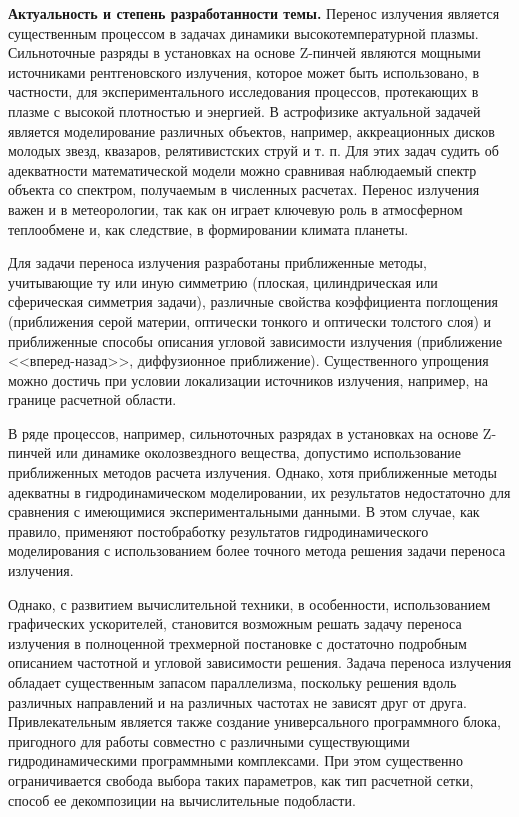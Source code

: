 \newcommand{\actuality}{{\textbf{Актуальность и степень разработанности темы.}}}
\newcommand{\aim}{{\textbf{Целью}}}
\newcommand{\tasks}{{\textbf{задачи}}}
\newcommand{\novelty}{{\textbf{Научная новизна:}}}
\newcommand{\influence}{{\textbf{Теоретическая и практическая значимость}}}
\newcommand{\defpositions}{{\textbf{Основные положения, выносимые на~защиту}}}
\newcommand{\probation}{{\textbf{Степень достоверности и апробация работы.}}}
\newcommand{\methodology}{{\textbf{Методология и методы исследования.}}}

{\actuality} Перенос излучения является существенным процессом в задачах динамики высокотемпературной плазмы. Сильноточные разряды в установках на основе Z-пинчей являются мощными источниками рентгеновского излучения, которое может быть использовано, в частности, для экспериментального исследования процессов, протекающих в плазме с высокой плотностью и энергией. 
В астрофизике актуальной задачей является моделирование различных объектов, например, аккреационных дисков молодых звезд, квазаров, релятивистских струй и т. п.
Для этих задач судить об адекватности математической модели можно сравнивая наблюдаемый спектр объекта со спектром, получаемым в численных расчетах.
Перенос излучения важен и в метеорологии, так как он играет ключевую роль в атмосферном теплообмене и, как следствие, в формировании климата планеты.

Для задачи переноса излучения разработаны приближенные методы, учитывающие ту или иную симметрию (плоская, цилиндрическая или сферическая симметрия задачи), различные свойства коэффициента поглощения (приближения серой материи, оптически тонкого и оптически толстого слоя) и приближенные способы описания угловой зависимости излучения (приближение <<вперед-назад>>, диффузионное приближение). Существенного упрощения можно достичь при условии локализации источников излучения, например, на границе расчетной области.

В ряде процессов, например, сильноточных разрядах в установках на основе Z-пинчей или динамике околозвездного вещества, допустимо использование приближенных методов расчета излучения. Однако, хотя приближенные методы адекватны в гидродинамическом моделировании, их результатов недостаточно для сравнения с имеющимися экспериментальными данными. В этом случае, как правило, применяют постобработку результатов гидродинамического моделирования с использованием более точного метода решения задачи переноса излучения.

Однако, с развитием вычислительной техники, в особенности, использованием графических ускорителей, становится возможным решать задачу переноса излучения в полноценной трехмерной постановке с достаточно подробным описанием частотной и угловой зависимости решения. Задача переноса излучения обладает существенным запасом параллелизма, поскольку решения вдоль различных направлений и на различных частотах не зависят друг от друга. Привлекательным является также создание универсального программного блока, пригодного для работы совместно с различными существующими гидродинамическими программными комплексами. При этом существенно ограничивается свобода выбора таких параметров, как тип расчетной сетки, способ ее декомпозиции на вычислительные подобласти.

